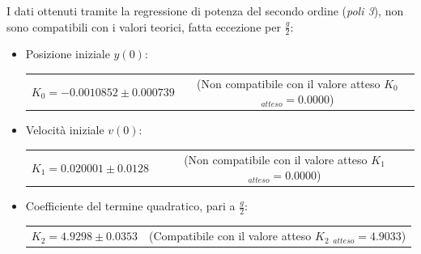 \documentclass[12pt, a4paper]{article}
\begin{document}
I dati ottenuti tramite la regressione di potenza del secondo ordine (\textit{poli 3}), non sono compatibili con i valori teorici, fatta eccezione per $\frac{g}{2}$:


\renewcommand{\theenumii}{\roman{enumii}}  
\begin{itemize}
    \itemsep0em 
        \item Posizione iniziale $y(0)$:\\
        \begin{tabular}{cc}
        {$K_0 = -0.0010852 \pm 0.000739$} &  \small{(Non compatibile con il valore atteso $K_{0}$ $_{atteso}= 0.0000$)}  \\
        \end{tabular}
        
    \end{itemize}
    \begin{itemize}
        \item Velocità iniziale $v(0)$:\\
        \begin{tabular}{cc}
        {$K_1 =  0.020001 \pm 0.0128$} & \small{(Non compatibile con il valore atteso $K_{1}$ $_{atteso} = 0.0000$)}\\
        \end{tabular}
        
    \end{itemize}
      \begin{itemize}
          \item Coefficiente del termine quadratico, pari a $\displaystyle{\frac{g}{2}}$:\\ 
          \begin{tabular}{cc}
              {$K_2 =  4.9298 \pm 0.0353$} & \small{(Compatibile con il valore atteso $K_{2}$ $_{atteso}= 4.9033$)}\\
          \end{tabular}
         
      \end{itemize}
        
        
\newpage
\end{document}
